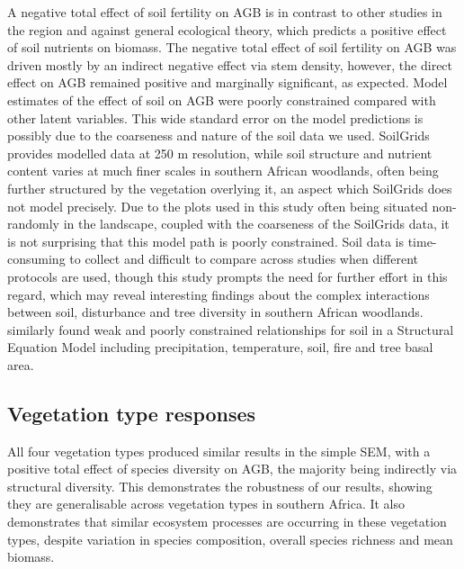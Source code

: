 \documentclass[11pt,a4paper]{article}
\begin{document}
A negative total effect of soil fertility on AGB is in contrast to other studies in the region and against general ecological theory, which predicts a positive effect of soil nutrients on biomass. The negative total effect of soil fertility on AGB was driven mostly by an indirect negative effect via stem density, however, the direct effect on AGB remained positive and marginally significant, as expected. Model estimates of the effect of soil on AGB were poorly constrained compared with other latent variables. This wide standard error on the model predictions is possibly due to the coarseness and nature of the soil data we used. SoilGrids provides modelled data at 250 m resolution, while soil structure and nutrient content varies at much finer scales \citep{Muledi2017, Bucini2007} in southern African woodlands, often being further structured by the vegetation overlying it, an aspect which SoilGrids does not model precisely. Due to the plots used in this study often being situated non-randomly in the landscape, coupled with the coarseness of the SoilGrids data, it is not surprising that this model path is poorly constrained. Soil data is time-consuming to collect and difficult to compare across studies when different protocols are used, though this study prompts the need for further effort in this regard, which may reveal interesting findings about the complex interactions between soil, disturbance and tree diversity in southern African woodlands. \citet{Lehmann2014} similarly found weak and poorly constrained relationships for soil in a Structural Equation Model including precipitation, temperature, soil, fire and tree basal area.

\subsection{Vegetation type responses}

All four vegetation types produced similar results in the simple SEM, with a positive total effect of species diversity on AGB, the majority being indirectly via structural diversity. This demonstrates the robustness of our results, showing they are generalisable across vegetation types in southern Africa. It also demonstrates that similar ecosystem processes are occurring in these vegetation types, despite variation in species composition, overall species richness and mean biomass.
\end{document}
